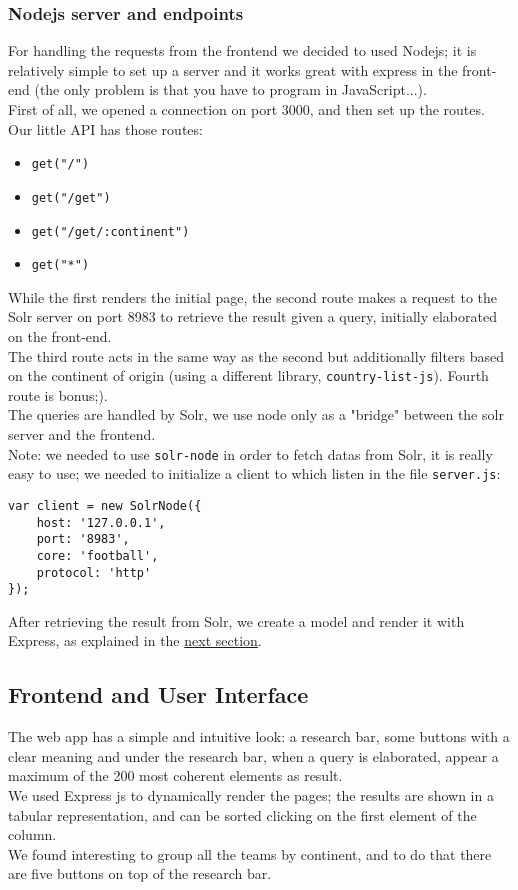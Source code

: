 \documentclass{article}
\begin{document}
\subsubsection{Nodejs server and endpoints}
For handling the requests from the frontend we decided to used Nodejs; it is relatively simple to set up a server and it works great with express in the front-end (the only problem is that you have to program in JavaScript...).\\
First of all, we opened a connection on port 3000, and then set up the routes.\\
Our little API has those routes:
\begin{itemize}
    \item \texttt{get("/")}
    \item \texttt{get("/get")}
    \item \texttt{get("/get/:continent")}
    \item \texttt{get("*")}
\end{itemize}
While the first renders the initial page, the second route makes a request to the Solr server on port 8983 to retrieve the result given a query, initially elaborated on the front-end.\\The third route acts in the same way as the second but additionally filters based on the continent of origin (using a different library, \texttt{country-list-js}). Fourth route is bonus;).\\
The queries are handled by Solr, we use node only as a "bridge" between the solr server and the frontend.\\
Note: we needed to use \texttt{solr-node} in order to fetch datas from Solr, it is really easy to use; we needed to initialize a client to which listen in the file \texttt{server.js}:\\
\begin{lstlisting}[caption={Snippet of code in \texttt{server.js} to set up connection with Solr server}, captionpos=b]
var client = new SolrNode({
    host: '127.0.0.1',
    port: '8983',
    core: 'football',
    protocol: 'http'
});
\end{lstlisting}
After retrieving the result from Solr, we create a model and render it with Express, as explained in the \hyperref[sec:frontend]{next section}.

\subsection{Frontend and User Interface}
\label{sec:frontend}
The web app has a simple and intuitive look: a research bar, some buttons with a clear meaning and under the research bar, when a query is elaborated, appear a maximum of the 200 most coherent elements as result.\\
We used Express js to dynamically render the pages; the results are shown in a tabular representation, and can be sorted clicking on the first element of the column.\\ We found interesting to group all the teams by continent, and to do that there are five buttons on top of the research bar.
\end{document}
